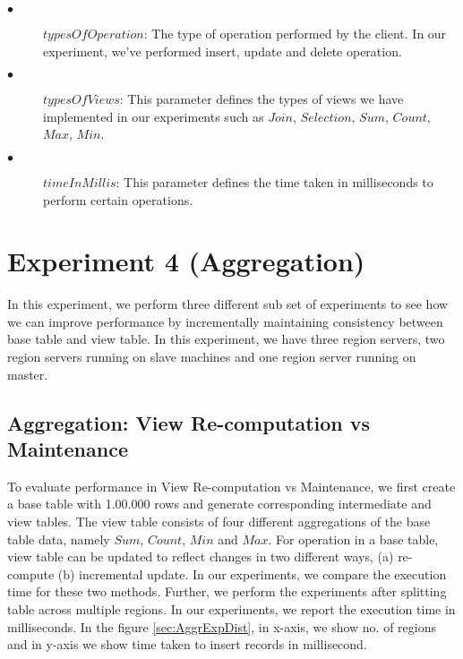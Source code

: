 \documentclass[11pt,a4paper,bibtotoc,idxtotoc,headsepline,footsepline,footexclude,BCOR12mm,DIV13]{scrbook}
\begin{document}
\begin{description}
	\item[$\bullet$]  $typesOfOperation$: The type of operation performed by the client. In our experiment, we've performed insert, update and delete operation. 
\end{description}

\begin{description}
	\item[$\bullet$]  $typesOfViews$: This parameter defines the types of views we have implemented in our experiments such as $Join$, $Selection$, $Sum$, $Count$, $Max$, $Min$. 
\end{description}

\begin{description}
	\item[$\bullet$]  $timeInMillis$: This parameter defines the time taken in milliseconds to perform certain operations. 
\end{description}

\section{Experiment 4 (Aggregation)}
\label{(sec:AggrExpDist)}
In this experiment, we perform three different sub set of experiments to see how we can improve performance by incrementally maintaining consistency between base table and view table. In this experiment, we have three region servers, two region servers running on slave machines and one region server running on master. 

\subsection{Aggregation: View Re-computation vs Maintenance}
To evaluate performance in View Re-computation vs Maintenance, we first create a base table with 1.00.000 rows and generate corresponding intermediate and view tables. The view table consists of four different aggregations of the base table data, namely $Sum$, $Count$, $Min$ and $Max$. For operation in a base table, view table can be updated to reflect changes in two different ways, (a) re-compute (b) incremental update. In our experiments, we compare the execution time for these two methods. Further, we perform the experiments after splitting table across multiple regions. In our experiments, we report the execution time in milliseconds. In the figure \ref{sec:AggrExpDist}, in x-axis, we show no. of regions and in y-axis we show time taken to insert records in millisecond. 
\end{document}
